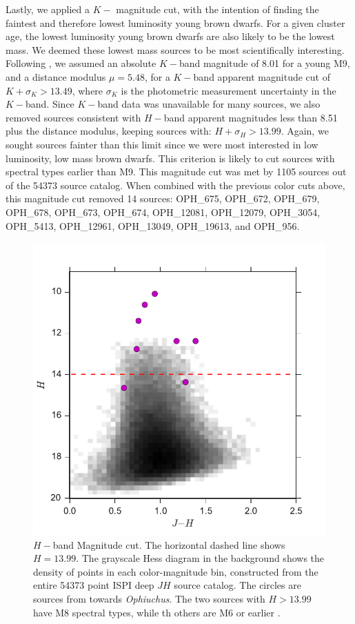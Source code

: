 \documentclass[12pt,preprint]{aastex}
\begin{document}
Lastly, we applied a $K-$ magnitude cut, with the intention of finding the faintest and therefore lowest luminosity young brown dwarfs.  For a given cluster age, the lowest luminosity young brown dwarfs are also likely to be the lowest mass.  We deemed these lowest mass sources to be most scientifically interesting.  Following \citet{allers06}, we assumed an absolute $K-$band magnitude of 8.01 for a young M9, and a distance modulus $\mu=5.48$, for a $K-$band apparent magnitude cut of $K + \sigma_{K} > 13.49$, where $\sigma_K$ is the photometric measurement uncertainty in the $K-$band.  Since $K-$band data was unavailable for many sources, we also removed sources consistent with $H-$band apparent magnitudes less than 8.51 plus the distance modulus, keeping sources with: $H+\sigma_{H} > 13.99$.  Again, we sought sources fainter than this limit since we were most interested in low luminosity, low mass brown dwarfs.  This criterion is likely to cut sources with spectral types earlier than M9.  This magnitude cut was met by 1105 sources out of the 54373 source catalog.  When combined with the previous color cuts above, this magnitude cut removed 14 sources: OPH\_675, OPH\_672, OPH\_679, OPH\_678, OPH\_673, OPH\_674, OPH\_12081, OPH\_12079, OPH\_3054, OPH\_5413, OPH\_12961, OPH\_13049, OPH\_19613, and OPH\_956.

\begin{figure}[ht!]
  \caption{$H-$band Magnitude cut.  The horizontal dashed line shows $H=13.99$.  The grayscale Hess diagram in the background shows the density of points in each color-magnitude bin, constructed from the entire 54373 point ISPI deep $JH$ source catalog.  The circles are sources from \citet{allers06} towards \emph{Ophiuchus}.  The two \citet{allers06} sources with $H>13.99$ have M8 spectral types, while th others are M6 or earlier \citep{2011ASPC..448..633G}. \label{fig_NIR_selection_H}}
\centering
\includegraphics[scale=0.6]{figures/NIR_selection_H_allers_oph}
\end{figure}
\end{document}
